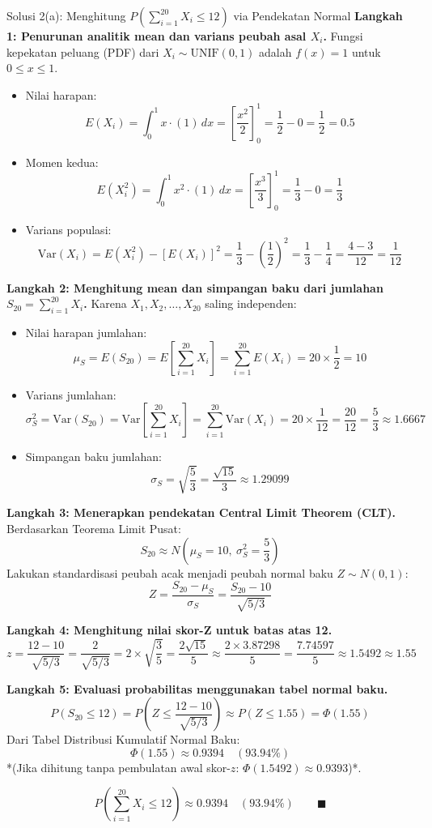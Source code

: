 \documentclass[10pt,twoside]{article}
\begin{document}
\begin{solbox}{Solusi 2(a): Menghitung $P\left(\sum_{i=1}^{20} X_i \le 12\right)$ via Pendekatan Normal}
\textbf{Langkah 1: Penurunan analitik mean dan varians peubah asal $X_i$.}
Fungsi kepekatan peluang (PDF) dari $X_i \sim \text{UNIF}(0, 1)$ adalah $f(x) = 1$ untuk $0 \le x \le 1$.
\begin{itemize}
  \item Nilai harapan:
  \[
  E(X_i) = \int_0^1 x \cdot (1) \, dx = \left[\frac{x^2}{2}\right]_0^1 = \frac{1}{2} - 0 = \frac{1}{2} = 0.5
  \]
  \item Momen kedua:
  \[
  E(X_i^2) = \int_0^1 x^2 \cdot (1) \, dx = \left[\frac{x^3}{3}\right]_0^1 = \frac{1}{3} - 0 = \frac{1}{3}
  \]
  \item Varians populasi:
  \[
  \mathrm{Var}(X_i) = E(X_i^2) - [E(X_i)]^2 = \frac{1}{3} - \left(\frac{1}{2}\right)^2 = \frac{1}{3} - \frac{1}{4} = \frac{4 - 3}{12} = \frac{1}{12}
  \]
\end{itemize}

\textbf{Langkah 2: Menghitung mean dan simpangan baku dari jumlahan $S_{20} = \sum_{i=1}^{20} X_i$.}
Karena $X_1, X_2, \dots, X_{20}$ saling independen:
\begin{itemize}
  \item Nilai harapan jumlahan:
  \[
  \mu_S = E(S_{20}) = E\left[\sum_{i=1}^{20} X_i\right] = \sum_{i=1}^{20} E(X_i) = 20 \times \frac{1}{2} = 10
  \]
  \item Varians jumlahan:
  \[
  \sigma_S^2 = \mathrm{Var}(S_{20}) = \mathrm{Var}\left[\sum_{i=1}^{20} X_i\right] = \sum_{i=1}^{20} \mathrm{Var}(X_i) = 20 \times \frac{1}{12} = \frac{20}{12} = \frac{5}{3} \approx 1.6667
  \]
  \item Simpangan baku jumlahan:
  \[
  \sigma_S = \sqrt{\frac{5}{3}} = \frac{\sqrt{15}}{3} \approx 1.29099
  \]
\end{itemize}

\textbf{Langkah 3: Menerapkan pendekatan Central Limit Theorem (CLT).}
Berdasarkan Teorema Limit Pusat:
\[
S_{20} \approx N\left(\mu_S = 10, \ \sigma_S^2 = \frac{5}{3}\right)
\]
Lakukan standardisasi peubah acak menjadi peubah normal baku $Z \sim N(0, 1)$:
\[
Z = \frac{S_{20} - \mu_S}{\sigma_S} = \frac{S_{20} - 10}{\sqrt{5/3}}
\]

\textbf{Langkah 4: Menghitung nilai skor-Z untuk batas atas 12.}
\[
z = \frac{12 - 10}{\sqrt{5/3}} = \frac{2}{\sqrt{5/3}} = 2 \times \sqrt{\frac{3}{5}} = \frac{2\sqrt{15}}{5} \approx \frac{2 \times 3.87298}{5} = \frac{7.74597}{5} \approx 1.5492 \approx 1.55
\]

\textbf{Langkah 5: Evaluasi probabilitas menggunakan tabel normal baku.}
\[
P(S_{20} \le 12) = P\left(Z \le \frac{12 - 10}{\sqrt{5/3}}\right) \approx P(Z \le 1.55) = \Phi(1.55)
\]
Dari Tabel Distribusi Kumulatif Normal Baku:
\[
\Phi(1.55) \approx 0.9394 \quad (93.94\%)
\]
*(Jika dihitung tanpa pembulatan awal skor-$z$: $\Phi(1.5492) \approx 0.9393$)*.

\[
\boxed{P\left(\sum_{i=1}^{20} X_i \le 12\right) \approx 0.9394 \quad (93.94\%)} \qquad \blacksquare
\]
\end{solbox}
\end{document}

